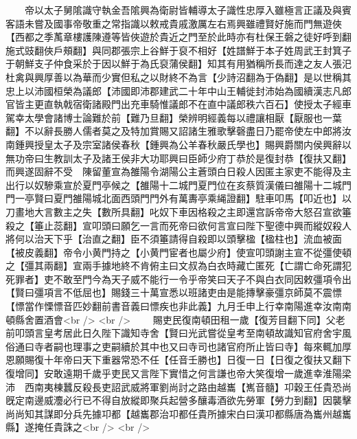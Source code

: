 　　帝以太子舅隂識守執金吾隂興為衛尉皆輔導太子識性忠厚入雖極言正議及與賓客語未嘗及國事帝敬重之常指識以敕戒貴戚激厲左右焉興雖禮賢好施而門無遊俠【西都之季萭章樓護陳遵等皆俠遊於貴近之門至於此時亦有杜保王磐之徒好呼到翻施式豉翻俠戶頰翻】與同郡張宗上谷鮮于裒不相好【姓譜鮮于本子姓周武王封箕子于朝鮮支子仲食采於于因以鮮于為氏裒蒲侯翻】知其有用猶稱所長而達之友人張汜杜禽與興厚善以為華而少實但私之以財終不為言【少詩沼翻為于偽翻】是以世稱其忠上以沛國桓榮為議郎【沛國即沛郡建武二十年中山王輔徙封沛始為國續漢志凡郎官皆主更直執戟宿衛諸殿門出充車騎惟議郎不在直中議郎秩六百石】使授太子經車駕幸太學會諸博士論難於前【難乃旦翻】榮辨明經義每以禮讓相厭【厭服也一葉翻】不以辭長勝人儒者莫之及特加賞賜又詔諸生雅歌擊磬盡日乃罷帝使左中郎將汝南鍾興授皇太子及宗室諸侯春秋【鍾興為公羊春秋嚴氏學也】賜興爵關内侯興辭以無功帝曰生教訓太子及諸王侯非大功耶興曰臣師少府丁恭於是復封恭【復扶又翻】而興遂固辭不受　陳留董宣為雒陽令湖陽公主蒼頭白日殺人因匿主家吏不能得及主出行以奴驂乘宣於夏門亭候之【雒陽十二城門夏門位在亥蔡質漢儀曰雒陽十二城門門一亭賢曰夏門雒陽城北面西頭門門外有萬夀亭乘䋲證翻】駐車叩馬【叩近也】以刀畫地大言數主之失【數所具翻】叱奴下車因格殺之主即還宫訴帝帝大怒召宣欲箠殺之【箠止蕊翻】宣叩頭曰願乞一言而死帝曰欲何言宣曰陛下聖德中興而縱奴殺人將何以治天下乎【治直之翻】臣不須箠請得自殺即以頭擊楹【楹柱也】流血被面【被皮義翻】帝令小黄門持之【小黄門宦者也屬少府】使宣叩頭謝主宣不從彊使頓之【彊其兩翻】宣兩手據地終不肯俯主曰文叔為白衣時藏亡匿死【亡謂亡命死謂犯死罪者】吏不敢至門今為天子威不能行一令乎帝笑曰天子不與白衣同因敕彊項令出【賢曰彊項言不低屈也】賜錢三十萬宣悉以班諸吏由是能摶擊豪彊京師莫不震慓【慓當作慄慓音匹妙翻前書音義曰慓疾也非此義】九月壬申上行幸南陽進幸汝南南頓縣舍置酒會<br />
<br />
　　賜吏民復南頓田租一歲【復芳目翻下同】父老前叩頭言皇考居此日久陛下識知寺舍【賢曰光武嘗從皇考至南頓故識知官府舍宇風俗通曰寺者嗣也理事之吏嗣續於其中也又曰寺司也諸官府所止皆曰寺】每來輒加厚恩願賜復十年帝曰天下重器常恐不任【任音壬勝也】日復一日【日復之復扶又翻下復增同】安敢遠期千歲乎吏民又言陛下實惜之何言謙也帝大笑復增一歲進幸淮陽梁沛　西南夷棟蠶反殺長吏詔武威將軍劉尚討之路由越巂【嶲音髓】卭穀王任貴恐尚旣定南邊威灋必行已不得自放縱即聚兵起營多釀毒酒欲先勞軍【勞力到翻】因襲擊尚尚知其謀即分兵先據卭都【越巂郡治卭都任貴所據宋白曰漢卭都縣唐為巂州越巂縣】遂掩任貴誅之<br />
<br />
